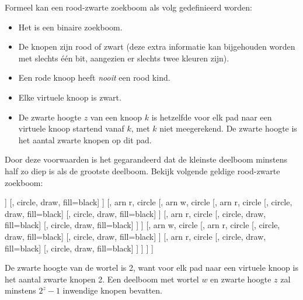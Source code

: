 \documentclass{report}
\begin{document}
	
	Formeel kan een rood-zwarte zoekboom als volg gedefinieerd worden:
	\begin{itemize}
		\item Het is een binaire zoekboom.
		\item De knopen zijn rood of zwart (deze extra informatie kan bijgehouden worden met slechts één bit, aangezien er slechts twee kleuren zijn).
		\item Een rode knoop heeft \textit{nooit} een rood kind.
		\item Elke virtuele knoop is zwart.
		\item De zwarte hoogte $z$ van een knoop $k$ is hetzelfde voor elk pad naar een virtuele knoop startend vanaf $k$, met $k$ niet meegerekend. De zwarte hoogte is het aantal zwarte knopen op dit pad.
	\end{itemize}
	Door deze voorwaarden is het gegarandeerd dat de kleinste deelboom minstens half zo diep is als de grootste deelboom. Bekijk volgende geldige rood-zwarte zoekboom:
	
	\begin{forest} 
		[, arn w, circle
			[, arn w, circle
				[, arn r, circle
					[, circle, draw, fill=black]
					[, circle, draw, fill=black]
				]
				[, circle, draw, fill=black]
			]
			[, arn r, circle
				[, arn w, circle
					[, arn r, circle
						[, circle, draw, fill=black]
						[, circle, draw, fill=black]
					]
					[, arn r, circle
						[, circle, draw, fill=black]
						[, circle, draw, fill=black]
					]
				]
				[, arn w, circle
					[, arn r, circle
						[, circle, draw, fill=black]
						[, circle, draw, fill=black]
					]
					[, arn r, circle
						[, circle, draw, fill=black]
						[, circle, draw, fill=black]
					]
				]
			]
		]
	\end{forest}

	De zwarte hoogte van de wortel is 2, want voor elk pad naar een virtuele knoop is het aantal zwarte knopen 2. Een deelboom met wortel $w$ en zwarte hoogte $z$ zal minstens $2^z - 1$ inwendige knopen bevatten.
	
	
\end{document}
